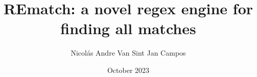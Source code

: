 
\title[REmatch: a novel regex engine for finding all matches]
{\bf REmatch: a novel regex engine for finding all matches}
\author[Nicolás Andre Van Sint Jan Campos]{Nicolás Andre Van Sint Jan Campos}

\address{Escuela de Ingeniería\\
Pontificia Universidad Católica de Chile\\
Vicuña Mackenna 4860\\
Santiago, Chile\\
{\it Tel.\/} : 56 (2) 354-2000}

\subject                            {Computer Science}
\date                               {October 2023}
\dedication                         {To my parents, Franz and Daniela.}


\NoChapterPageNumber
\fancyhf{}
\fancyfoot[C]{\fontsize{11pt}{11pt}\selectfont\thepage}
\maketitle
\topmargin -20mm
\headheight 7mm
\headsep 20mm
\oddsidemargin 7.3mm



